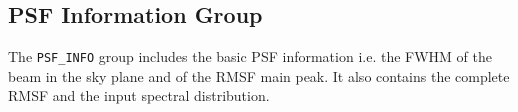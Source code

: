 \documentclass[a4paper,10pt,bibtotoc]{scrartcl}
\begin{document}

\subsection{PSF Information Group}
\label{sec:pdf info group}

The \texttt{PSF\_INFO} group includes the basic PSF information i.e. the FWHM of the beam in the sky plane and of the RMSF main peak. It also contains the complete RMSF and the input spectral distribution. 
\end{document}
